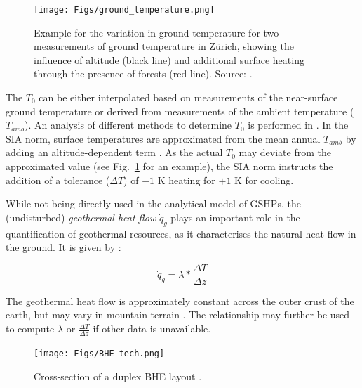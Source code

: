 \begin{figure}
    \centering
    \texttt{[image: Figs/ground\_temperature.png]}
    \caption[Example for the variation in ground temperature for two measurements of ground temperature in Zürich.]{Example for the variation in ground temperature for two measurements of ground temperature in Zürich, showing the influence of altitude (black line) and additional surface heating through the presence of forests (red line). Source: \citet{huber_bodentemperaturen_2014}.}
    \label{fig:T_ground}
\end{figure}

The $T_0$ can be either interpolated based on measurements of the near-surface ground temperature \cite{assouline_machine_2019} or derived from measurements of the ambient temperature ($T_\mathit{amb}$). An analysis of different methods to determine $T_0$ is performed in \citep{signorelli_geoscientific_2004}. In the SIA norm, surface temperatures are  approximated from the mean annual $T_\mathit{amb}$ by adding an altitude-dependent term \cite{sia_sondes_2010}. As the actual $T_0$ may deviate from the approximated value (see Fig.~\ref{fig:T_ground} for an example), the SIA norm instructs the addition of a tolerance ($\Delta T$) of $- 1$ K heating for  $+1$ K for cooling.

While not being directly used in the analytical model of GSHPs, the (undisturbed) \textit{geothermal heat flow} $\dot{q}_{g}$ plays an important role in the quantification of geothermal resources, as it characterises the natural heat flow in the ground. It is given by \cite{huber_bodentemperaturen_2014}:

\begin{equation}
    \dot{q}_{g} = \lambda * \frac{\Delta T}{\Delta z}
\end{equation}

The geothermal heat flow is approximately constant across the outer crust of the earth, but may vary in mountain terrain \citep{huber_bodentemperaturen_2014}. The relationship may further be used to compute $\lambda$ or $ \frac{\Delta T}{\Delta z}$ if other data is unavailable.

\begin{figure}[b]
    \centering
    \texttt{[image: Figs/BHE\_tech.png]}
    \caption[Cross-section of a duplex BHE layout.]{Cross-section of a duplex BHE layout \citep{pahud_geothermal_2002}.}
    \label{fig:BHE_cross-sec}
\end{figure}

